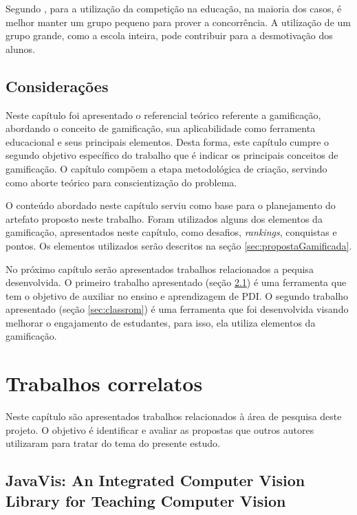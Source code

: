 \documentclass[
	12pt,				%
	oneside,			%
	a4paper,			%
	english,			%
	french,				%
	spanish,			%
	brazil,				%
	]{abntex2}
\begin{document}
Segundo \citet{andre2018}, para a utilização da competição na educação, na maioria dos casos, é melhor manter um grupo pequeno para prover a concorrência. A utilização de um grupo grande, como a escola inteira, pode contribuir para a desmotivação dos alunos.

\section{Considerações}

Neste capítulo foi apresentado o referencial teórico referente a gamificação, abordando o conceito de gamificação, sua aplicabilidade como ferramenta educacional e seus principais elementos. Desta forma, este capítulo cumpre o segundo objetivo específico do trabalho que é indicar os principais conceitos de gamificação. O capítulo compõem a etapa metodológica de criação, servindo como aborte teórico para conscientização do problema.

O conteúdo abordado neste capítulo serviu como base para o planejamento do artefato proposto neste trabalho. Foram utilizados alguns dos elementos da gamificação, apresentados neste capítulo, como desafios, \textit{rankings}, conquistas e pontos. Os elementos utilizados serão descritos na seção \ref{sec:propostaGamificada}.

No próximo capítulo serão apresentados trabalhos relacionados a pequisa desenvolvida. O primeiro trabalho apresentado (seção \ref{sec:javavis}) é uma ferramenta que tem o objetivo de auxiliar no ensino e aprendizagem de PDI. O segundo trabalho apresentado (seção \ref{sec:classrom}) é uma ferramenta que foi desenvolvida visando melhorar o engajamento de estudantes, para isso, ela utiliza elementos da gamificação.

\chapter{Trabalhos correlatos}
\label{sec:trabalhosCorrelatos}

Neste capítulo são apresentados trabalhos relacionados à área de pesquisa deste projeto. O objetivo é identificar e avaliar as propostas que outros autores utilizaram para tratar do tema do presente estudo.

\section{JavaVis: An Integrated Computer Vision Library for Teaching Computer Vision}
\label{sec:javavis}
\end{document}
